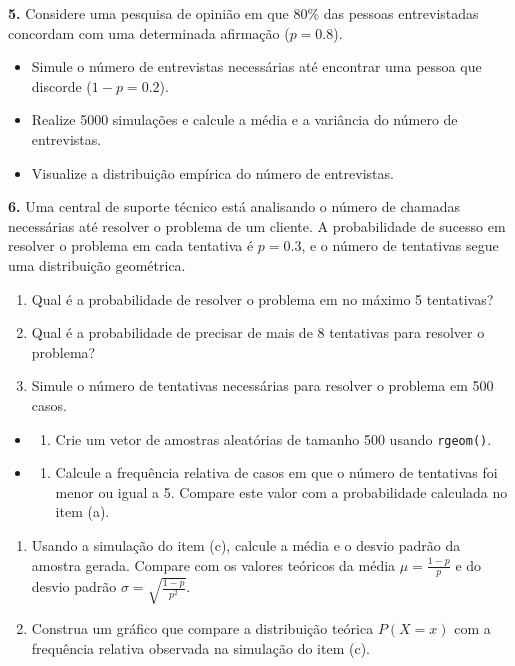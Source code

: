 \documentclass[
]{book}
\providecommand{\tightlist}{%
  \setlength{\itemsep}{0pt}\setlength{\parskip}{0pt}}
\begin{document}
\textbf{5.} Considere uma pesquisa de opinião em que 80\% das pessoas entrevistadas concordam com uma determinada afirmação (\(p = 0.8\)).

\begin{itemize}
\tightlist
\item
  Simule o número de entrevistas necessárias até encontrar uma pessoa que discorde (\(1-p = 0.2\)).
\item
  Realize 5000 simulações e calcule a média e a variância do número de entrevistas.
\item
  Visualize a distribuição empírica do número de entrevistas.
\end{itemize}

\textbf{6.} Uma central de suporte técnico está analisando o número de chamadas necessárias até resolver o problema de um cliente. A probabilidade de sucesso em resolver o problema em cada tentativa é \(p = 0.3\), e o número de tentativas segue uma distribuição geométrica.

\begin{enumerate}
\def\labelenumi{(\alph{enumi})}
\item
  Qual é a probabilidade de resolver o problema em no máximo 5 tentativas?
\item
  Qual é a probabilidade de precisar de mais de 8 tentativas para resolver o problema?
\item
  Simule o número de tentativas necessárias para resolver o problema em 500 casos.
\end{enumerate}

\begin{itemize}
\tightlist
\item
  \begin{enumerate}
  \def\labelenumi{(\roman{enumi})}
  \tightlist
  \item
    Crie um vetor de amostras aleatórias de tamanho 500 usando \texttt{rgeom()}.
  \end{enumerate}
\item
  \begin{enumerate}
  \def\labelenumi{(\roman{enumi})}
  \setcounter{enumi}{1}
  \tightlist
  \item
    Calcule a frequência relativa de casos em que o número de tentativas foi menor ou igual a 5. Compare este valor com a probabilidade calculada no item (a).
  \end{enumerate}
\end{itemize}

\begin{enumerate}
\def\labelenumi{(\alph{enumi})}
\setcounter{enumi}{3}
\item
  Usando a simulação do item (c), calcule a média e o desvio padrão da amostra gerada. Compare com os valores teóricos da média \(\mu = \frac{1-p}{p}\) e do desvio padrão \(\sigma = \sqrt{\frac{1-p}{p^2}}\).
\item
  Construa um gráfico que compare a distribuição teórica \(P(X = x)\) com a frequência relativa observada na simulação do item (c).
\end{enumerate}
\end{document}
